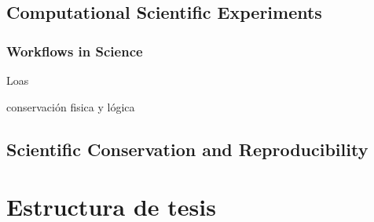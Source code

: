 \subsection{Computational Scientific Experiments}

\subsubsection{Workflows in Science}

Loas

conservación fisica y lógica

\subsection{Scientific Conservation and Reproducibility}

\section{Estructura de tesis}
